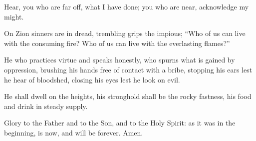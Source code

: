 \settowidth{\versewidth}{Who of us can live with the everlasting flames?”}
\begin{psalmverse}%
  \begin{patverse}
Hear, you who are far off,
what I have done;
you who are near,
acknowledge my might.

On Zion sinners are in dread,
trembling grips the impious;
“Who of us can live with the consuming fire?
Who of us can live with the everlasting flames?”

He who practices virtue and speaks honestly,
who spurns what is gained by oppression,
brushing his hands
free of contact with a bribe,
stopping his ears lest he hear of bloodshed,
closing his eyes lest he look on evil.

He shall dwell on the heights,
his stronghold shall be the rocky fastness,
his food and drink
in steady supply.

Glory to the Father and to the Son,
and to the Holy Spirit:
as it was in the beginning, is now,
and will be forever. Amen. 
  \end{patverse}
\end{psalmverse}
